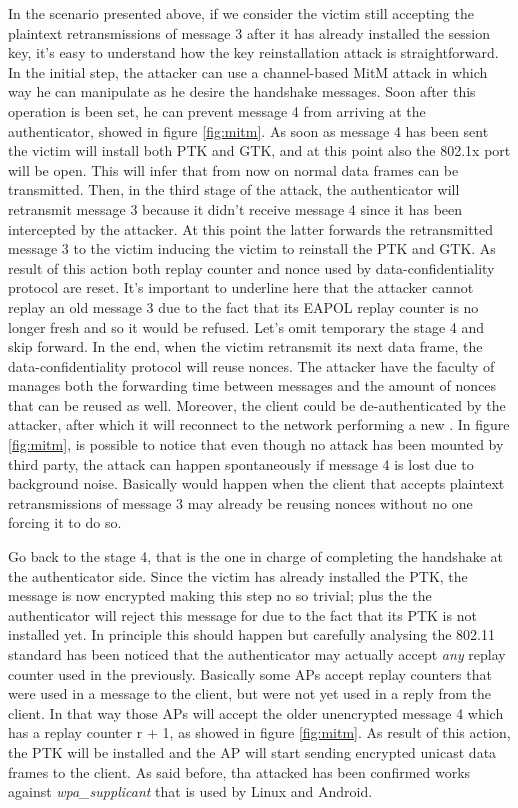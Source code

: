 In the scenario presented above, if we consider the victim still accepting the plaintext retransmissions of message 3 after it has already installed the session key, it's easy to understand how 
the key reinstallation attack is straightforward. In the initial step, the attacker can use a channel-based MitM attack in which way he can manipulate as he desire the handshake messages. Soon after
this operation is been set, he can prevent message 4 from arriving at the authenticator, showed in figure \ref{fig:mitm}.
As soon as message 4 has been sent the victim will install both PTK and GTK, and at this point also the 802.1x port will be open. This will infer that from now on normal data frames can be transmitted.
Then, in the third stage of the attack, the authenticator will retransmit message 3 because it didn't receive message 4 since it has been intercepted by the attacker. At this point the latter forwards the
retransmitted message 3 to the victim inducing the victim to reinstall the PTK and GTK. As result of this action both replay counter and nonce used by data-confidentiality protocol are reset.
It's important to underline here that the attacker cannot replay an old message 3 due to the fact that its EAPOL replay counter is no longer fresh and so it would be refused. Let's omit temporary the stage 4
and skip forward. In the end, when the victim retransmit its next data frame, the data-confidentiality protocol will reuse nonces. The attacker have the faculty of manages both the forwarding time between messages
and the amount of nonces that can be reused as well. Moreover, the client could be de-authenticated by the attacker, after which it will reconnect to the network performing a new \fwh.
In figure \ref{fig:mitm}, is possible to notice that even though no attack has been mounted by third party, the \krack attack can happen spontaneously if message 4 is lost due to background noise.
Basically would happen when the client that accepts plaintext retransmissions of message 3 may already be reusing nonces without no one forcing it to do so. 

Go back to the stage 4, that is the one in charge of completing the handshake at the authenticator side. Since the victim has already installed the PTK, the message is now encrypted making this step no so trivial; plus 
the the authenticator will reject this message for due to the fact that its PTK is not installed yet. In principle this should happen but carefully analysing the 802.11 standard has been noticed that the authenticator may actually
accept \textit{any} replay counter used in the \fwh previously. Basically some APs accept replay counters that were used in a message to the client, but were not yet used in a reply from the client. In that way those APs will accept
the older unencrypted message 4 which has a replay counter r + 1, as showed in figure \ref{fig:mitm}. As result of this action, the PTK will be installed and the AP will start sending encrypted unicast data frames to the client.
As said before, tha attacked has been confirmed works against \textit{wpa\_supplicant} that is used by Linux and Android.\cite{VanhoefM2017KraF}



